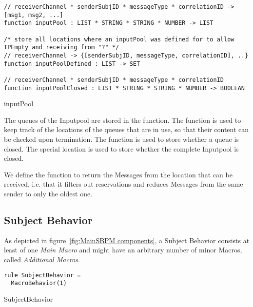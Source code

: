 \begin{listing}[H]
\begin{verbatim}
// receiverChannel * senderSubjID * messageType * correlationID -> [msg1, msg2, ...]
function inputPool : LIST * STRING * STRING * NUMBER -> LIST

/* store all locations where an inputPool was defined for to allow IPEmpty and receiving from "?" */
// receiverChannel -> {[senderSubjID, messageType, correlationID], ..}
function inputPoolDefined : LIST -> SET

// receiverChannel * senderSubjID * messageType * correlationID
function inputPoolClosed : LIST * STRING * STRING * NUMBER -> BOOLEAN
\end{verbatim}
\caption{inputPool}
\label{lst:shortasm:inputPool}
\end{listing}


The queues of the Inputpool are stored in the  function.
The function  is used to keep track of the
locations of the queues that are in use, so that their content can be checked
upon termination. The function  is used to store
whether a queue is closed. The special location
 is used to
store whether the complete Inputpool is closed.

We define the function  to return the
Messages from the location  that can be received, i.e. that it
filters out reservations and reduces Messages from the same sender to only
the oldest one.

\subsection{Subject Behavior}


As depicted in figure~\ref{fig:MainSBPM components}, a Subject Behavior consists at least of one \textit{Main Macro}
and might have an arbitrary number of minor Macros, called \textit{Additional Macros}.

\begin{listing}[H]
\begin{verbatim}
rule SubjectBehavior =
  MacroBehavior(1)
\end{verbatim}
\caption{SubjectBehavior}
\label{lst:shortasm:SubjectBehavior}
\end{listing}

